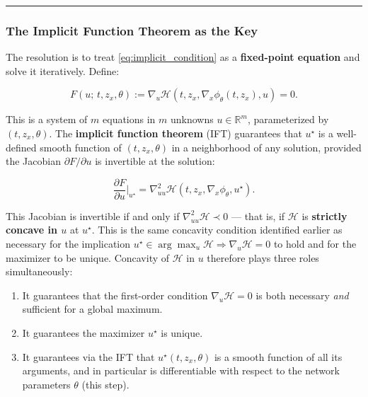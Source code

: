 \documentclass{article}
\begin{document}
\medskip\hrule\medskip

\subsubsection{The Implicit Function Theorem as the Key}

\begin{mathrequirementsbox}
The resolution is to treat \eqref{eq:implicit_condition} as a
\textbf{fixed-point equation} and solve it iteratively. Define:

\begin{equation}
    F(u;\, t, z_x, \theta)
    := \nabla_u \mathcal{H}(t, z_x, \nabla_x \phi_\theta(t, z_x), u)
    = 0.
    \label{eq:fixed_point}
\end{equation}

This is a system of $m$ equations in $m$ unknowns $u \in \mathbb{R}^m$,
parameterized by $(t, z_x, \theta)$. The \textbf{implicit function theorem}
(IFT) guarantees that $u^\star$ is a well-defined smooth function of
$(t, z_x, \theta)$ in a neighborhood of any solution, provided the Jacobian
$\partial F / \partial u$ is invertible at the solution:

\begin{equation}
    \frac{\partial F}{\partial u}\bigg|_{u^\star}
    = \nabla^2_{uu} \mathcal{H}(t, z_x, \nabla_x\phi_\theta, u^\star).
    \label{eq:IFT_condition}
\end{equation}

This Jacobian is invertible if and only if $\nabla^2_{uu}\mathcal{H} \prec 0$
--- that is, if $\mathcal{H}$ is \textbf{strictly concave in $u$} at $u^\star$.
This is the same concavity condition identified earlier as necessary
for the implication $u^\star \in \arg\max_u \mathcal{H} \Rightarrow \nabla_u
\mathcal{H} = 0$ to hold and for the maximizer to be unique. Concavity of
$\mathcal{H}$ in $u$ therefore plays three roles simultaneously:

\begin{enumerate}
    \item It guarantees that the first-order condition $\nabla_u \mathcal{H} = 0$
          is both necessary \textit{and} sufficient for a global maximum.
    \item It guarantees the maximizer $u^\star$ is unique.
    \item It guarantees via the IFT that $u^\star(t, z_x, \theta)$ is a
          smooth function of all its arguments, and in particular is
          differentiable with respect to the network parameters $\theta$
          (this step).
\end{enumerate}


\end{mathrequirementsbox}
\end{document}

